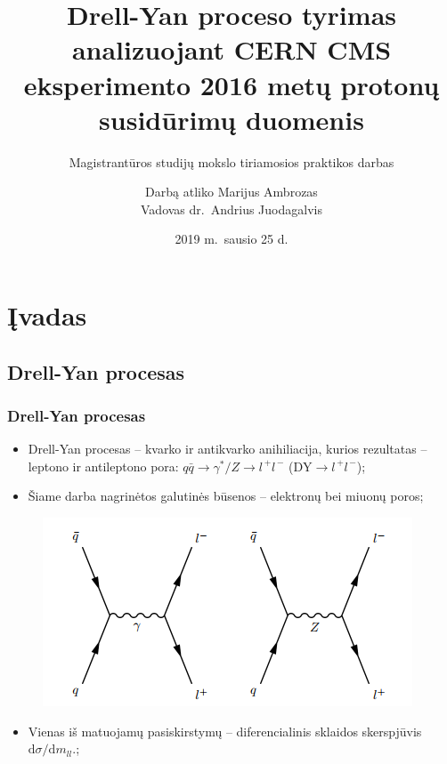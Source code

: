 \documentclass[xcolor=dvipsnames]{beamer}
\title[Drell-Yan analizė]{Drell-Yan proceso tyrimas analizuojant CERN CMS eksperimento 2016 metų protonų susidūrimų duomenis}
\subtitle{Magistrantūros studijų mokslo tiriamosios praktikos darbas}
\author[M.\ Ambrozas]
{Darbą atliko Marijus Ambrozas\\ Vadovas dr.\ Andrius Juodagalvis}
\institute[VU FF]
{
  Vilniaus universitetas, Fizikos fakultetas
}
\date[2019-01-25]{2019 m.\ sausio 25 d.}
\begin{document}
\frame{\titlepage}


\section{Įvadas}

\begin{frame}
	\subsection{Drell-Yan procesas}
	\frametitle{Drell-Yan procesas}
	\begin{itemize}
		\item Drell-Yan procesas -- kvarko ir antikvarko anihiliacija, kurios rezultatas -- leptono ir antileptono pora:
		$\mathit{q}\bar{\mathit{q}}\rightarrow \gamma^{*}/\mathit{Z}\rightarrow \mathit{l^{\, +}\! l^{\, -}}$
		($\mathrm{DY}\!\rightarrow\!\mathit{l^{\, +}\! l^{\, -}}$);
		\item Šiame darba nagrinėtos galutinės būsenos -- elektronų bei miuonų poros;
	\end{itemize}
	\begin{minipage}{0.45\textwidth}
		\begin{figure}[H]
			\includegraphics[width=\textwidth]{DYprocess.PNG}
		\end{figure}
		\begin{itemize}
			\item \small Vienas iš matuojamų pasiskirstymų -- diferencialinis sklaidos skerspjūvis
			$\mathrm{d}\sigma/\mathrm{d}\mathit{m}_{\mathit{ll}}$.;
		\end{itemize}
	\end{minipage}
	\hfill
	\begin{minipage}{0.54\textwidth}
		\vspace{-0.2cm}
		\begin{figure}[H]

\end{figure}
\end{minipage}
\end{frame}
\end{document}
